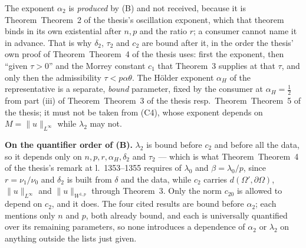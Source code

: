 \begin{helper}
The exponent $\alpha_2$ is \emph{produced} by (B) and not received, because it
is Theorem~Theorem~2 of the thesis's oscillation exponent, which that theorem binds in its
own existential after $n,p$ and the ratio $r$; a consumer cannot name it in
advance.  That is why $\delta_2$, $\tau_2$ and $c_2$ are bound after it, in the
order the thesis' own proof of Theorem~Theorem~4 of the thesis uses: first the exponent,
then ``given $\tau>0$'' and the Morrey constant $c_1$ that Theorem~3 supplies at
that $\tau$, and only then the admissibility $\tau<p\alpha\theta$.  The
H\"older exponent $\alpha_H$ of the representative is a separate, \emph{bound}
parameter, fixed by the consumer at $\alpha_H=\tfrac12$ from part (iii) of
Theorem~Theorem~3 of the thesis resp.\ Theorem~Theorem~5 of the thesis; it must not be taken from (C4),
whose exponent depends on $M=\|u\|_{L^\infty}$ while $\lambda_2$ may not.

\medskip
\noindent\textbf{On the quantifier order of (B).}  $\lambda_2$ is bound before
$c_2$ and before all the data, so it depends only on $n,p,r,\alpha_H,\delta_2$
and $\tau_2$ --- which is what Theorem~Theorem~4 of the thesis's remark at l.~1353--1355
requires of $\lambda_0$ and $\beta=\lambda_0/p$, since $r=\nu_1/\nu_0$ and
$\delta_2$ is built from $\delta$ and the data, while $c_2$ carries
$d(\Omega',\partial\Omega)$, $\|u\|_{L^\infty}$ and $\|u\|_{W^{1,p}}$ through
Theorem~3.  Only the norm $c_{20}$ is allowed to depend on $c_2$, and it does.
The four cited results are bound before $\alpha_2$; each mentions only $n$ and
$p$, both already bound, and each is universally quantified over its remaining
parameters, so none introduces a dependence of $\alpha_2$ or $\lambda_2$ on
anything outside the lists just given.
\end{helper}
